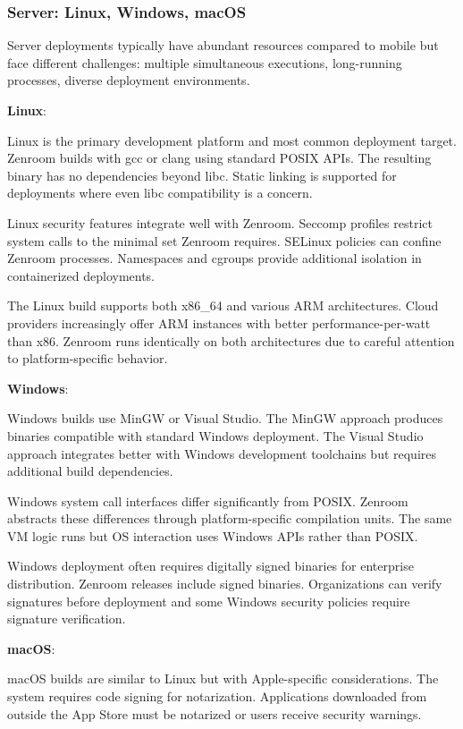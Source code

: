 \subsubsection{Server: Linux, Windows, macOS}

Server deployments typically have abundant resources compared to
mobile but face different challenges: multiple simultaneous
executions, long-running processes, diverse deployment environments.

\textbf{Linux}:

Linux is the primary development platform and most common deployment
target. Zenroom builds with gcc or clang using standard POSIX
APIs. The resulting binary has no dependencies beyond libc. Static
linking is supported for deployments where even libc compatibility is
a concern.

Linux security features integrate well with Zenroom. Seccomp profiles
restrict system calls to the minimal set Zenroom requires. SELinux
policies can confine Zenroom processes. Namespaces and cgroups provide
additional isolation in containerized deployments.

The Linux build supports both x86\_64 and various ARM
architectures. Cloud providers increasingly offer ARM instances with
better performance-per-watt than x86. Zenroom runs identically on both
architectures due to careful attention to platform-specific behavior.

\textbf{Windows}:

Windows builds use MinGW or Visual Studio. The MinGW approach produces
binaries compatible with standard Windows deployment. The Visual
Studio approach integrates better with Windows development toolchains
but requires additional build dependencies.

Windows system call interfaces differ significantly from
POSIX. Zenroom abstracts these differences through platform-specific
compilation units. The same VM logic runs but OS interaction uses
Windows APIs rather than POSIX.

Windows deployment often requires digitally signed binaries for
enterprise distribution. Zenroom releases include signed
binaries. Organizations can verify signatures before deployment and
some Windows security policies require signature verification.

\textbf{macOS}:

macOS builds are similar to Linux but with Apple-specific
considerations. The system requires code signing for
notarization. Applications downloaded from outside the App Store must
be notarized or users receive security warnings.

